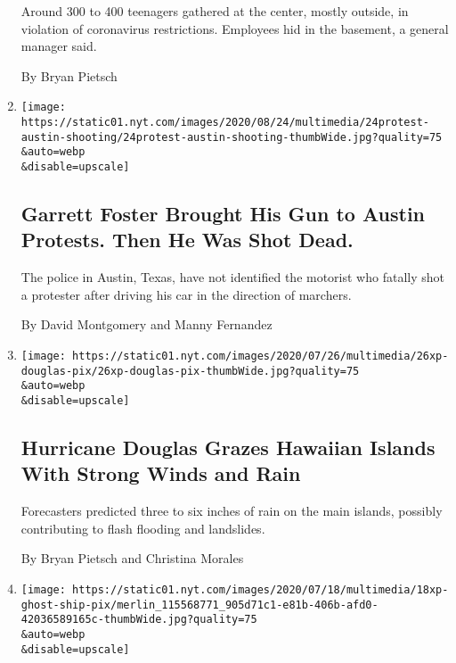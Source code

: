 \begin{enumerate}
  Around 300 to 400 teenagers gathered at the center, mostly outside, in
  violation of coronavirus restrictions. Employees hid in the basement,
  a general manager said.

  By Bryan Pietsch
\item
  \href{/2020/07/26/us/austin-shooting-texas-protests.html}{}

  \texttt{[image: https://static01.nyt.com/images/2020/08/24/multimedia/24protest-austin-shooting/24protest-austin-shooting-thumbWide.jpg?quality=75\\\&auto=webp\\\&disable=upscale]}

  \hypertarget{garrett-foster-brought-his-gun-to-austin-protests-then-he-was-shot-dead}{%
  \subsection{Garrett Foster Brought His Gun to Austin Protests. Then He
  Was Shot
  Dead.}\label{garrett-foster-brought-his-gun-to-austin-protests-then-he-was-shot-dead}}

  The police in Austin, Texas, have not identified the motorist who
  fatally shot a protester after driving his car in the direction of
  marchers.

  By David Montgomery and Manny Fernandez
\item
  \href{/2020/07/26/us/hurricane-douglas-hawaii.html}{}

  \texttt{[image: https://static01.nyt.com/images/2020/07/26/multimedia/26xp-douglas-pix/26xp-douglas-pix-thumbWide.jpg?quality=75\\\&auto=webp\\\&disable=upscale]}

  \hypertarget{hurricane-douglas-grazes-hawaiian-islands-with-strong-winds-and-rain}{%
  \subsection{Hurricane Douglas Grazes Hawaiian Islands With Strong
  Winds and
  Rain}\label{hurricane-douglas-grazes-hawaiian-islands-with-strong-winds-and-rain}}

  Forecasters predicted three to six inches of rain on the main islands,
  possibly contributing to flash flooding and landslides.

  By Bryan Pietsch and Christina Morales
\item
  \href{/2020/07/18/us/ghost-ship-fire-settlement.html}{}

  \texttt{[image: https://static01.nyt.com/images/2020/07/18/multimedia/18xp-ghost-ship-pix/merlin\_115568771\_905d71c1-e81b-406b-afd0-42036589165c-thumbWide.jpg?quality=75\\\&auto=webp\\\&disable=upscale]}


\end{enumerate}
